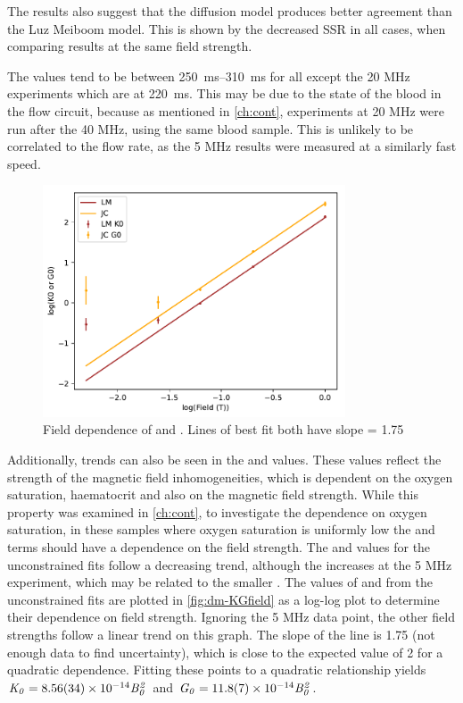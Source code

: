 The results also suggest that the diffusion model produces better agreement than the Luz Meiboom model.
This is shown by the decreased SSR in all cases, when comparing results at the same field strength.

The \TtwoO values tend to be between \SIrange{250}{310}{ms} for all except the 20 MHz experiments which are at \SI{220}{ms}.
This may be due to the state of the blood in the flow circuit, because as mentioned in \autoref{ch:cont}, experiments at 20 MHz were run after the 40 MHz, using the same blood sample.
This is unlikely to be correlated to the flow rate, as the 5 MHz results were measured at a similarly fast speed.
\begin{figure}[h]
\centering
\includegraphics[width=0.8\textwidth]{figures/diffmodels/G0K0fieldloglog.pdf}
\caption[Field dependence of \Gzero and \Kzero]{Field dependence of \Gzero and \Kzero. Lines of best fit both have slope = 1.75}
\label{fig:dm-KGfield}
\end{figure}

Additionally, trends can also be seen in the \Kzero and \Gzero values.
These values reflect the strength of the magnetic field inhomogeneities, which is dependent on the oxygen saturation, haematocrit and also on the magnetic field strength.
While this property was examined in \autoref{ch:cont}, to investigate the dependence on oxygen saturation, in these samples where oxygen saturation is uniformly low the \Kzero and \Gzero terms should have a dependence on the field strength.
The \Kzero and \Gzero values for the unconstrained fits follow a decreasing trend, although the \Gzero increases at the 5 MHz experiment, which may be related to the smaller \rc.
The values of \Kzero and \Gzero from the unconstrained fits are plotted in \autoref{fig:dm-KGfield} as a log-log plot to determine their dependence on field strength.
Ignoring the 5 MHz data point, the other field strengths follow a linear trend on this graph.
The slope of the line is \num{1.75} (not enough data to find uncertainty), which is close to the expected value of 2 for a quadratic dependence.
Fitting these points to a quadratic relationship yields $\mathit{K_0=\num{8.56\pm0.34e-14}B_0^2}$ and $\mathit{G_0 = \num{11.8\pm0.7e-14}B_0^2}$.

